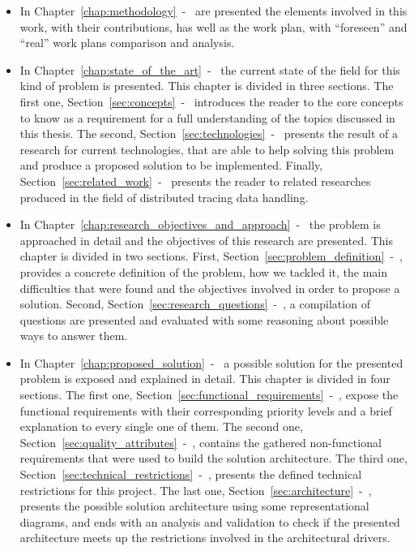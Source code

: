 \begin{itemize}
    \item In Chapter~\ref{chap:methodology}~-~ are presented the elements involved in this work, with their contributions, has well as the work plan, with ``foreseen'' and ``real'' work plans comparison and analysis.
    \item In Chapter~\ref{chap:state_of_the_art}~-~ the current state of the field for this kind of problem is presented. This chapter is divided in three sections. The first one, Section~\ref{sec:concepts}~-~ introduces the reader to the core concepts to know as a requirement for a full understanding of the topics discussed in this thesis. The second, Section~\ref{sec:technologies}~-~ presents the result of a research for current technologies, that are able to help solving this problem and produce a proposed solution to be implemented. Finally, Section~\ref{sec:related_work}~-~ presents the reader to related researches produced in the field of distributed tracing data handling.
    \item In Chapter~\ref{chap:research_objectives_and_approach}~-~ the problem is approached in detail and the objectives of this research are presented. This chapter is divided in two sections. First, Section~\ref{sec:problem_definition}~-~, provides a concrete definition of the problem, how we tackled it, the main difficulties that were found and the objectives involved in order to propose a solution. Second, Section~\ref{sec:research_questions}~-~, a compilation of questions are presented and evaluated with some reasoning about possible ways to answer them.
    \item In Chapter~\ref{chap:proposed_solution}~-~ a possible solution for the presented problem is exposed and explained in detail. This chapter is divided in four sections. The first one, Section~\ref{sec:functional_requirements}~-~, expose the functional requirements with their corresponding priority levels and a brief explanation to every single one of them. The second one, Section~\ref{sec:quality_attributes}~-~, contains the gathered non-functional requirements that were used to build the solution architecture. The third one, Section~\ref{sec:technical_restrictions}~-~, presents the defined technical restrictions for this project. The last one, Section~\ref{sec:architecture}~-~, presents the possible solution architecture using some representational diagrams, and ends with an analysis and validation to check if the presented architecture meets up the restrictions involved in the architectural drivers.

\end{itemize}
